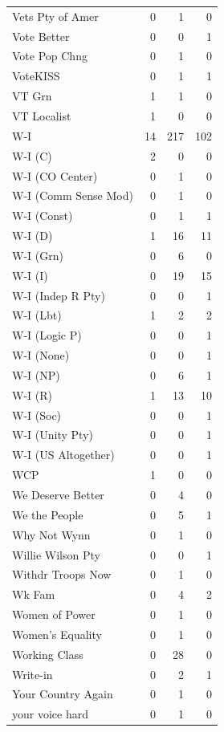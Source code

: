 \begin{supertabular}{lrrr}
Vets Pty of Amer & 0 & 1 & 0\\
Vote Better & 0 & 0 & 1\\
Vote Pop Chng & 0 & 1 & 0\\
VoteKISS & 0 & 1 & 1\\
VT Grn & 1 & 1 & 0\\
VT Localist & 1 & 0 & 0\\
W-I & 14 & 217 & 102\\
W-I (C) & 2 & 0 & 0\\
W-I (CO Center) & 0 & 1 & 0\\
W-I (Comm Sense Mod) & 0 & 1 & 0\\
W-I (Const) & 0 & 1 & 1\\
W-I (D) & 1 & 16 & 11\\
W-I (Grn) & 0 & 6 & 0\\
W-I (I) & 0 & 19 & 15\\
W-I (Indep R Pty) & 0 & 0 & 1\\
W-I (Lbt) & 1 & 2 & 2\\
W-I (Logic P) & 0 & 0 & 1\\
W-I (None) & 0 & 0 & 1\\
W-I (NP) & 0 & 6 & 1\\
W-I (R) & 1 & 13 & 10\\
W-I (Soc) & 0 & 0 & 1\\
W-I (Unity Pty) & 0 & 0 & 1\\
W-I (US Altogether) & 0 & 0 & 1\\
WCP & 1 & 0 & 0\\
We Deserve Better & 0 & 4 & 0\\
We the People & 0 & 5 & 1\\
Why Not Wynn & 0 & 1 & 0\\
Willie Wilson Pty & 0 & 0 & 1\\
Withdr Troops Now & 0 & 1 & 0\\
Wk Fam & 0 & 4 & 2\\
Women of Power & 0 & 1 & 0\\
Women's Equality & 0 & 1 & 0\\
Working Class & 0 & 28 & 0\\
Write-in & 0 & 2 & 1\\
Your Country Again & 0 & 1 & 0\\
your voice hard & 0 & 1 & 0\\
\bottomrule
\end{supertabular}
